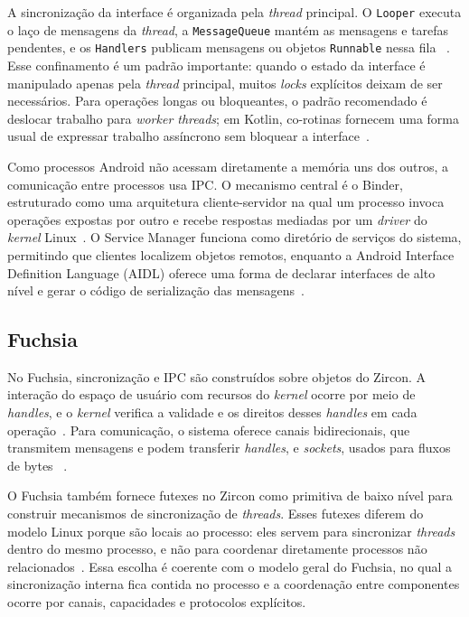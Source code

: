 \documentclass[12pt,a4paper]{article}
\begin{document}
A sincronização da interface é organizada pela \emph{thread} principal. O
\texttt{Looper} executa o laço de mensagens da \emph{thread}, a
\texttt{MessageQueue} mantém as mensagens e tarefas pendentes, e os
\texttt{Handlers} publicam mensagens ou objetos \texttt{Runnable} nessa fila
~\cite{android_process_threads}. Esse confinamento é um padrão importante:
quando o estado da interface é manipulado apenas pela \emph{thread} principal,
muitos \emph{locks} explícitos deixam de ser necessários. Para operações longas
ou bloqueantes, o padrão recomendado é deslocar trabalho para \emph{worker
threads}; em Kotlin, co-rotinas fornecem uma forma usual de expressar trabalho
assíncrono sem bloquear a interface~\cite{android_coroutines}.

Como processos Android não acessam diretamente a memória uns dos outros, a
comunicação entre processos usa IPC. O mecanismo central é o Binder, estruturado
como uma arquitetura cliente-servidor na qual um processo invoca operações
expostas por outro e recebe respostas mediadas por um \emph{driver} do
\emph{kernel} Linux~\cite{binder_overview,binder_ipc}. O Service Manager funciona
como diretório de serviços do sistema, permitindo que clientes localizem objetos
remotos, enquanto a Android Interface Definition Language (AIDL) oferece uma
forma de declarar interfaces de alto nível e gerar o código de serialização das
mensagens~\cite{binder_ipc}.

\subsection{Fuchsia}

No Fuchsia, sincronização e IPC são construídos sobre objetos do Zircon. A
interação do espaço de usuário com recursos do \emph{kernel} ocorre por meio de
\emph{handles}, e o \emph{kernel} verifica a validade e os direitos desses
\emph{handles} em cada operação~\cite{zircon_kernel_concepts}. Para comunicação,
o sistema oferece canais bidirecionais, que transmitem mensagens e podem
transferir \emph{handles}, e \emph{sockets}, usados para fluxos de bytes
~\cite{zircon_channel,zircon_socket}.

O Fuchsia também fornece futexes no Zircon como primitiva de baixo nível para
construir mecanismos de sincronização de \emph{threads}. Esses futexes diferem do
modelo Linux porque são locais ao processo: eles servem para sincronizar
\emph{threads} dentro do mesmo processo, e não para coordenar diretamente
processos não relacionados~\cite{zircon_futex}. Essa escolha é coerente com o
modelo geral do Fuchsia, no qual a sincronização interna fica contida no processo
e a coordenação entre componentes ocorre por canais, capacidades e protocolos
explícitos.
\end{document}
